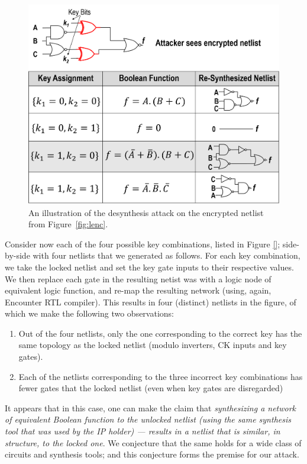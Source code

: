 \begin{figure}%
\centering
\includegraphics[width=0.9\columnwidth]{./figs/desynth.png}
\caption{An illustration of the desynthesis attack on the encrypted netlist from Figure~\ref{fig:lenc}. 
}
\label{fig:desynth}
\end{figure}

Consider now each of the four possible key combinations, listed in Figure \ref{}; side-by-side with four netlists that we generated as follows. For each key combination, we take the locked netlist and set the key gate inputs to their respective values. We then replace each gate in the resulting netist was with a logic node of equivalent logic function, and re-map the resulting network (using, again, Encounter RTL compiler). This results in four (distinct) netlists in the figure, of which we make the following two observations:

\begin{enumerate}
    \item Out of the four netlists, only the one corresponding to the correct key has the same topology as the locked netlist (modulo inverters, CK inputs and key gates).
    \item Each of the netlists corresponding to the three incorrect key combinations has fewer gates that the locked netlist (even when key gates are disregarded)
\end{enumerate}

It appears that in this case, one can make the claim that \emph{synthesizing a network of equivalent Boolean function to the unlocked netlist (using the same synthesis tool that was used by the IP holder) --- results in a netlist that is similar, \emph{in structure}, to the locked one}. We conjecture that the same holds for a wide class of circuits and synthesis tools; and this conjecture forms the premise for our attack.

